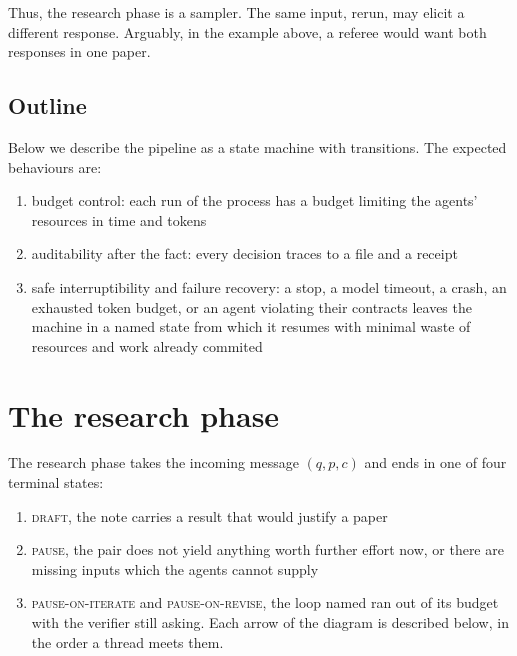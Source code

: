 \documentclass[11pt,a4paper]{article}
\newcommand{\st}[1]{\textsc{#1}}
\begin{document}
Thus, the research phase is a sampler. The same input, rerun, may
elicit a different response. Arguably, in the example above, 
a referee would want both responses in one paper.

\subsection{Outline} 

Below we describe the pipeline as a state machine with transitions. 
The expected behaviours are:
\begin{enumerate}
\item budget control: each run of the process has a budget limiting
the agents' resources in time and tokens
\item auditability after the fact: every decision traces to a file and a receipt
\item safe interruptibility and failure recovery: a stop, a model timeout, a
crash, an exhausted token budget, or an agent violating their contracts leaves
the machine in a named state from which it resumes with minimal waste of
resources and work already commited
\end{enumerate}



\section{The research phase}


\noindent The research phase takes the incoming message $(q,p,c)$ and ends in one of four
terminal states: 
\begin{enumerate}
\item \st{draft}, the note carries a result that would justify a paper
\item \st{pause}, the pair does not yield anything worth further effort now, or
there are missing inputs which the agents cannot supply
\item \st{pause-on-iterate} and \st{pause-on-revise}, the loop named ran out of
its budget with the verifier still asking. Each arrow of the diagram is
described below, in the order a thread meets them.
\end{enumerate}
\end{document}
